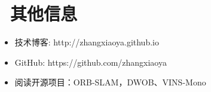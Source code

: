 \documentclass{resume}
\begin{document}

\section{\faInfo\ 其他信息}
\begin{itemize}[parsep=0.5ex]
  \item 技术博客: http://zhangxiaoya.github.io
  \item GitHub: https://github.com/zhangxiaoya
  \item 阅读开源项目：ORB-SLAM，DWOB、VINS-Mono
\end{itemize}
\end{document}
